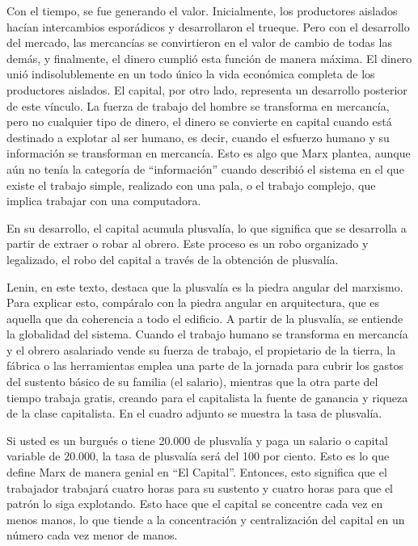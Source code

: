 \documentclass[
  jou,
  floatsintext,
  longtable,
  a4paper,
  nolmodern,
  notxfonts,
  notimes,
  12pt,
  colorlinks=true,linkcolor=blue,citecolor=blue,urlcolor=blue]{apa7}
\begin{document}
Con el tiempo, se fue generando el valor. Inicialmente, los productores
aislados hacían intercambios esporádicos y desarrollaron el trueque.
Pero con el desarrollo del mercado, las mercancías se convirtieron en el
valor de cambio de todas las demás, y finalmente, el dinero cumplió esta
función de manera máxima. El dinero unió indisolublemente en un todo
único la vida económica completa de los productores aislados. El
capital, por otro lado, representa un desarrollo posterior de este
vínculo. La fuerza de trabajo del hombre se transforma en mercancía,
pero no cualquier tipo de dinero, el dinero se convierte en capital
cuando está destinado a explotar al ser humano, es decir, cuando el
esfuerzo humano y su información se transforman en mercancía. Esto es
algo que Marx plantea, aunque aún no tenía la categoría de
``información'' cuando describió el sistema en el que existe el trabajo
simple, realizado con una pala, o el trabajo complejo, que implica
trabajar con una computadora.

En su desarrollo, el capital acumula plusvalía, lo que significa que se
desarrolla a partir de extraer o robar al obrero. Este proceso es un
robo organizado y legalizado, el robo del capital a través de la
obtención de plusvalía.

Lenin, en este texto, destaca que la plusvalía es la piedra angular del
marxismo. Para explicar esto, compáralo con la piedra angular en
arquitectura, que es aquella que da coherencia a todo el edificio. A
partir de la plusvalía, se entiende la globalidad del sistema. Cuando el
trabajo humano se transforma en mercancía y el obrero asalariado vende
su fuerza de trabajo, el propietario de la tierra, la fábrica o las
herramientas emplea una parte de la jornada para cubrir los gastos del
sustento básico de su familia (el salario), mientras que la otra parte
del tiempo trabaja gratis, creando para el capitalista la fuente de
ganancia y riqueza de la clase capitalista. En el cuadro adjunto se
muestra la tasa de plusvalía.

Si usted es un burgués o tiene 20.000 de plusvalía y paga un salario o
capital variable de 20.000, la tasa de plusvalía será del 100 por
ciento. Esto es lo que define Marx de manera genial en ``El Capital''.
Entonces, esto significa que el trabajador trabajará cuatro horas para
su sustento y cuatro horas para que el patrón lo siga explotando. Esto
hace que el capital se concentre cada vez en menos manos, lo que tiende
a la concentración y centralización del capital en un número cada vez
menor de manos.
\end{document}
